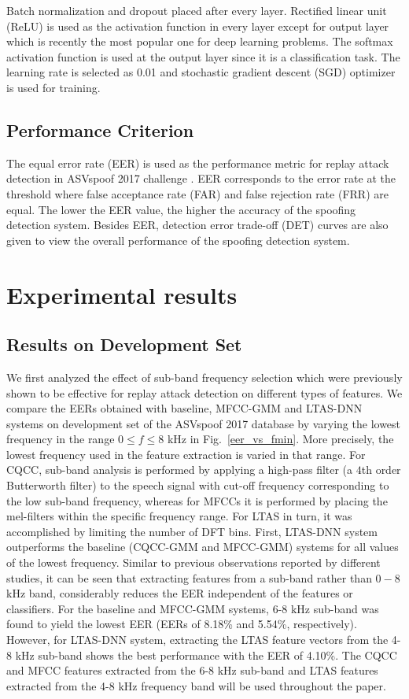 \documentclass{article}
\begin{document}
Batch normalization and dropout placed after every layer. Rectified linear unit (ReLU) is used as the activation
function in every layer except for output layer which is recently the most popular one for deep learning problems.
The softmax activation function is used at the output layer since it is a classification task. The learning rate is
selected as 0.01 and stochastic gradient descent (SGD) optimizer is used for training.

\subsection{Performance Criterion}
\label{performance_criterion}
The equal error rate (EER) is used as the performance metric for replay attack detection in ASVspoof 2017 challenge
\cite{kinnunen2017asvspoof}. EER corresponds to the error rate at the threshold where false acceptance rate (FAR) and
false rejection rate (FRR) are equal. The lower the EER value, the higher the accuracy of the spoofing detection
system. Besides EER, detection error trade-off (DET) curves \cite{martin1997det} are also given to view the overall
performance of the spoofing detection system.

\section{Experimental results}
\label{sec:experimental_work}
\subsection{Results on Development Set}
We first analyzed the effect of sub-band frequency selection which were previously shown to be effective for replay
attack detection on different types of features. We compare the EERs obtained with baseline, MFCC-GMM and LTAS-DNN
systems on development set of the ASVspoof 2017 database by varying the lowest frequency in the range $0\leq f \leq
    8$ kHz in Fig.~\ref{eer_vs_fmin}. More precisely, the lowest frequency used in the feature extraction is varied in
that range. For CQCC, sub-band analysis is performed by applying a high-pass filter (a $4$th order Butterworth filter)
to the speech signal with cut-off frequency corresponding to the low sub-band frequency, whereas for MFCCs it is
performed by placing the mel-filters within the specific frequency range. For LTAS in turn, it was accomplished by
limiting the number of DFT bins. First, LTAS-DNN system outperforms the baseline (CQCC-GMM and MFCC-GMM) systems for
all values of the lowest frequency. Similar to previous observations reported by different studies, it can be seen that
extracting features from a sub-band rather than $0-8$ kHz band, considerably reduces the EER independent of the
features or classifiers. For the baseline and MFCC-GMM systems, 6-8 kHz sub-band was found to yield the lowest EER
(EERs of 8.18\% and 5.54\%, respectively). However, for LTAS-DNN system, extracting the LTAS feature vectors from the
4-8 kHz sub-band shows the best performance with the EER of 4.10\%. The CQCC and MFCC features extracted from the 6-8
kHz sub-band and LTAS features extracted from the 4-8 kHz frequency band will be used throughout the paper.
\end{document}
